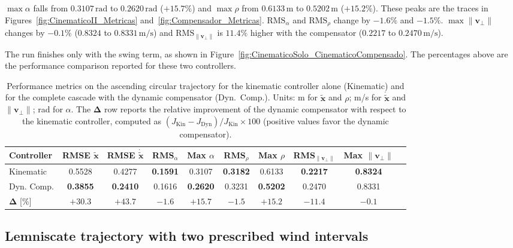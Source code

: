 \documentclass[sn-mathphys-num]{sn-jnl}
\theoremstyle{thmstyleone}%
\theoremstyle{thmstyletwo}%
\theoremstyle{thmstylethree}%
\begin{document}
$\max\alpha$ falls from $0.3107\,\mathrm{rad}$ to $0.2620\,\mathrm{rad}$ ($+15.7\%$) and $\max\rho$ from $0.6133\,\mathrm{m}$ to $0.5202\,\mathrm{m}$ ($+15.2\%$). These peaks are the traces in Figures~\ref{fig:CinematicoII_Metricas} and~\ref{fig:Compensador_Metricas}. $\mathrm{RMS}_\alpha$ and $\mathrm{RMS}_\rho$ change by $-1.6\%$ and $-1.5\%$. $\max\|\mathbf{v}_\perp\|$ changes by $-0.1\%$ ($0.8324$ to $0.8331\,\mathrm{m/s}$) and $\mathrm{RMS}_{\|\mathbf{v}_\perp\|}$ is $11.4\%$ higher with the compensator ($0.2217$ to $0.2470\,\mathrm{m/s}$).

The run finishes only with the swing term, as shown in Figure~\ref{fig:CinematicoSolo_CinematicoCompensado}. The percentages above are the performance comparison reported for these two controllers.
 
\begin{table}[t]
\centering
\caption{Performance metrics on the ascending circular trajectory for the kinematic controller alone (Kinematic) and for the complete cascade with the dynamic compensator (Dyn.\ Comp.). Units: m for $\tilde{\mathbf{x}}$ and $\rho$; m/s for $\dot{\tilde{\mathbf{x}}}$ and $\|\mathbf{v}_\perp\|$; rad for $\alpha$. The $\boldsymbol{\Delta}$ row reports the relative improvement of the dynamic compensator with respect to the kinematic controller, computed as $(J_{\mathrm{Kin}}-J_{\mathrm{Dyn}})/J_{\mathrm{Kin}}\times100$ (positive values favor the dynamic compensator).}
\label{tab:metrics}
\renewcommand{\arraystretch}{1.15}
\setlength{\tabcolsep}{4pt}
\begin{tabular}{lccccccccc}
\toprule
Controller
& RMSE $\tilde{\mathbf{x}}$
& RMSE $\dot{\tilde{\mathbf{x}}}$
& RMS$_{\alpha}$
& Max $\alpha$
& RMS$_{\rho}$
& Max $\rho$
& RMS$_{\|\mathbf{v}_\perp\|}$
& Max $\|\mathbf{v}_\perp\|$ \\
\midrule
Kinematic
& 0.5528 & 0.4277 & \textbf{0.1591} & 0.3107
& \textbf{0.3182} & 0.6133 & \textbf{0.2217} & \textbf{0.8324} \\
Dyn. Comp.
& \textbf{0.3855} & \textbf{0.2410} & 0.1616 & \textbf{0.2620}
& 0.3231 & \textbf{0.5202} & 0.2470 & 0.8331 \\
\midrule
$\boldsymbol{\Delta}$ [\%]
& $+30.3$ & $+43.7$ & $-1.6$ & $+15.7$
& $-1.5$ & $+15.2$ & $-11.4$ & $-0.1$ \\
\bottomrule
\end{tabular}
\end{table}
\subsection{Lemniscate trajectory with two prescribed wind intervals}
\label{sec:robustness_wind}
\end{document}
